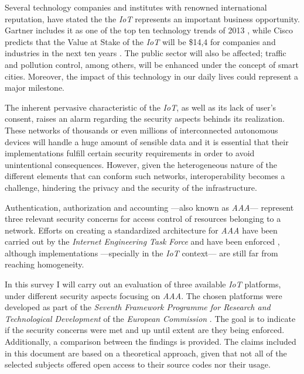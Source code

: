 \documentclass[journal]{IEEEtran}
\begin{document}
  Several technology companies and institutes with renowned international reputation, have stated the the \emph{IoT} represents an important business opportunity. Gartner includes it as one of the top ten technology trends of 2013 \cite{Gartner2012}, while Cisco predicts that the Value at Stake of the \emph{IoT} will be \$14,4 for companies and industries in the next ten years \cite{JosephBradley2013}. The public sector will also be affected; traffic and pollution control, among others, will be enhanced under the concept of smart cities. Moreover, the impact of this technology in our daily lives could represent a major milestone.

  The inherent pervasive characteristic of the \emph{IoT}, as well as its lack of user's consent, raises an alarm regarding the security aspects behinds its realization. These networks of thousands or even millions of interconnected autonomous devices will handle a huge amount of sensible data and it is essential that their implementations fulfill certain security requirements in order to avoid unintentional consequences. However, given the heterogeneous nature of the different elements that can conform such networks, interoperability becomes a challenge, hindering the privacy and the security of the infrastructure.

  Authentication, authorization and accounting ---also known as \emph{AAA}--- represent three relevant security concerns for access control of resources belonging to a network. Efforts on creating a standardized architecture for \emph{AAA} have been carried out by the \emph{Internet Engineering Task Force} and have been enforced \cite{RFC2903}, \cite{RFC2904} although implementations ---specially in the \emph{IoT} context--- are still far from reaching homogeneity.
   
  In this survey I will carry out an evaluation of three available \emph{IoT} platforms, under different security aspects focusing on \emph{AAA}. The chosen platforms were developed as part of the \emph{Seventh Framework Programme for Research and Technological Development} of the \emph{European Commission} \cite{FP7}. The goal is to indicate if the security concerns were met and up until extent are they being enforced. Additionally, a comparison between the findings is provided. The claims included in this document are based on a theoretical approach, given that not all of the selected subjects offered open access to their source codes nor their usage.
\end{document}
